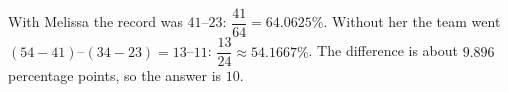 With Melissa the record was $41$--$23$: $\dfrac{41}{64}=64.0625\%$. Without her the team went $(54-41)$--$(34-23)=13$--$11$: $\dfrac{13}{24}\approx54.1667\%$. The difference is about $9.896$ percentage points, so the answer is $\boxed{10}$.
